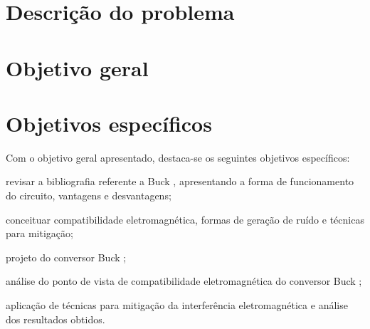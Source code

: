     \section{Descrição do problema}






    \section{Objetivo geral}



    \section{Objetivos específicos}

        Com o objetivo geral apresentado, destaca-se os seguintes objetivos específicos:

        \begin{alineas}

            \item revisar a bibliografia referente a Buck \interleaved, apresentando a forma de funcionamento do circuito, vantagens e desvantagens;

            \item conceituar compatibilidade eletromagnética, formas de geração de ruído e técnicas para mitigação;

            \item projeto do conversor Buck \interleaved;

            \item análise do ponto de vista de compatibilidade eletromagnética do conversor Buck \interleaved;

            \item aplicação de técnicas para mitigação da interferência eletromagnética e análise dos resultados obtidos.

        \end{alineas}
